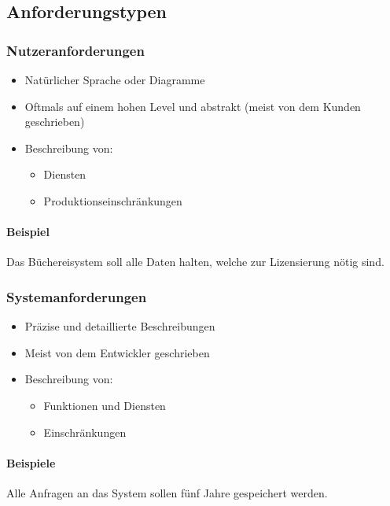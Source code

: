 \documentclass[a4paper, 11pt, accentcolor = tud3b]{tudreport}
\begin{document}
			\subsection{Anforderungstypen}
				\subsubsection{Nutzeranforderungen}
					\begin{itemize}
						\item Natürlicher Sprache oder Diagramme
						\item Oftmals auf einem hohen Level und abstrakt (meist von dem Kunden geschrieben)
						\item Beschreibung von:
							\begin{itemize}
								\item Diensten
								\item Produktionseinschränkungen
							\end{itemize}
					\end{itemize}
					
					\paragraph{Beispiel}
						Das Büchereisystem soll alle Daten halten, welche zur Lizensierung nötig sind.
				
				\subsubsection{Systemanforderungen}
					\begin{itemize}
						\item Präzise und detaillierte Beschreibungen
						\item Meist von dem Entwickler geschrieben
						\item Beschreibung von:
							\begin{itemize}
								\item Funktionen und Diensten
								\item Einschränkungen
							\end{itemize}
					\end{itemize}
					
					\paragraph{Beispiele}
						Alle Anfragen an das System sollen fünf Jahre gespeichert werden.
				
\end{document}
